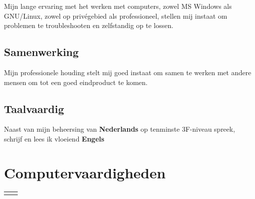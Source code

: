 \documentclass[
	10pt, %
]{FreemanCV}
\begin{document}
\begin{paracol}{2}
	Mijn lange ervaring met het werken met computers, zowel MS Windows als
	GNU/Linux, zowel op privégebied als professioneel, stellen mij instaat
	om problemen te troubleshooten en zelfstandig op te lossen.

	\subsection{Samenwerking}

	Mijn professionele houding stelt mij goed instaat om samen te werken
	met andere mensen om tot een goed eindproduct te komen.

	\subsection{Taalvaardig}

	Naast van mijn beheersing van {\sffamily\small\textbf{Nederlands}} op
	tenminste 3F-niveau spreek, schrijf en lees ik vloeiend
	{\sffamily\small\textbf{Engels}}


	\section{Computervaardigheden}




	\begin{supertabular}{r l} %



\end{supertabular}
\end{paracol}
\end{document}
